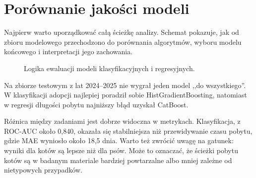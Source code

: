 \section{Porównanie jakości modeli}
\label{sec:porownanie-jakosci-modeli}

Najpierw warto uporządkować całą ścieżkę analizy. Schemat pokazuje, jak od zbioru modelowego przechodzono do porównania algorytmów, wyboru modelu końcowego i interpretacji jego zachowania.

\begin{figure}[htbp]
\centering
{}
\caption{Logika ewaluacji modeli klasyfikacyjnych i regresyjnych.}
\label{fig:logika-ewaluacji-modeli}
\end{figure}

Na zbiorze testowym z lat 2024--2025 nie wygrał jeden model ,,do wszystkiego''. W klasyfikacji adopcji najlepiej poradził sobie HistGradientBoosting, natomiast w regresji długości pobytu najniższy błąd uzyskał CatBoost.

Różnica między zadaniami jest dobrze widoczna w metrykach. Klasyfikacja, z ROC-AUC około 0,840, okazała się stabilniejsza niż przewidywanie czasu pobytu, gdzie MAE wyniosło około 18,5 dnia. Warto też zwrócić uwagę na gatunek: wyniki dla kotów są lepsze niż dla psów. Może to oznaczać, że ścieżki pobytu kotów są w badanym materiale bardziej powtarzalne albo mniej zależne od nietypowych przypadków.

